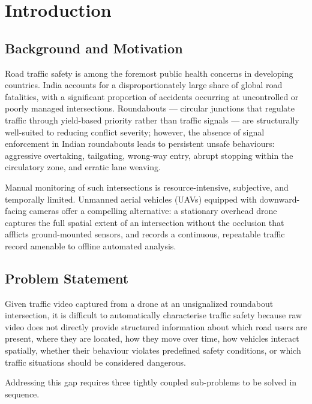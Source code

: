 \chapter{Introduction}
\label{chap:intro}

\section{Background and Motivation}

Road traffic safety is among the foremost public health concerns in developing countries.
India accounts for a disproportionately large share of global road fatalities, with a
significant proportion of accidents occurring at uncontrolled or poorly managed intersections.
Roundabouts --- circular junctions that regulate traffic through yield-based priority rather
than traffic signals --- are structurally well-suited to reducing conflict severity; however,
the absence of signal enforcement in Indian roundabouts leads to persistent unsafe behaviours:
aggressive overtaking, tailgating, wrong-way entry, abrupt stopping within the circulatory
zone, and erratic lane weaving.

Manual monitoring of such intersections is resource-intensive, subjective, and temporally
limited.  Unmanned aerial vehicles (UAVs) equipped with downward-facing cameras offer a
compelling alternative: a stationary overhead drone captures the full spatial extent of an
intersection without the occlusion that afflicts ground-mounted sensors, and records a
continuous, repeatable traffic record amenable to offline automated analysis.

\section{Problem Statement}

Given traffic video captured from a drone at an unsignalized roundabout intersection, it is
difficult to automatically characterise traffic safety because raw video does not directly
provide structured information about which road users are present, where they are located,
how they move over time, how vehicles interact spatially, whether their behaviour violates
predefined safety conditions, or which traffic situations should be considered dangerous.

Addressing this gap requires three tightly coupled sub-problems to be solved in sequence.

